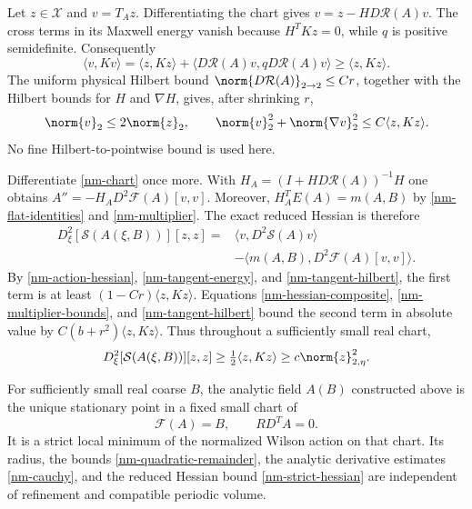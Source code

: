 Let $z\in\mathcal X$ and $v=T_Az$. Differentiating the chart gives
$v=z-HD\mathcal R(A)v$. The cross terms in its Maxwell energy
vanish because $H^TKz=0$, while $q$ is positive semidefinite.
Consequently
\begin{equation}\label{nm-tangent-energy}
 \langle v,Kv\rangle
 =\langle z,Kz\rangle+
   \langle D\mathcal R(A)v,qD\mathcal R(A)v\rangle
 \ge\langle z,Kz\rangle.
\end{equation}
The uniform physical Hilbert bound $\norm{D\mathcal R(A)}_{2\to2}
\le Cr$, together with the Hilbert bounds for $H$ and $\nabla H$,
gives, after shrinking $r$,
\begin{equation}\label{nm-tangent-hilbert}
 \norm{v}_2\le2\norm{z}_2,\qquad
 \norm{v}_2^2+\norm{\nabla v}_2^2
 \le C\langle z,Kz\rangle.
\end{equation}
No fine Hilbert-to-pointwise bound is used here.

Differentiate \eqref{nm-chart} once more. With
$H_A=(I+HD\mathcal R(A))^{-1}H$ one obtains
$A''=-H_AD^2\mathcal F(A)[v,v]$. Moreover,
$H_A^TE(A)=m(A,B)$ by \eqref{nm-flat-identities} and
\eqref{nm-multiplier}. The exact reduced Hessian is therefore
\begin{equation}\label{nm-reduced-hessian}
 \begin{split}
 D_\xi^2[\mathcal S(A(\xi,B))][z,z]
 ={}&\langle v,D^2\mathcal S(A)v\rangle\\
 &-\langle m(A,B),D^2\mathcal F(A)[v,v]\rangle.
 \end{split}
\end{equation}
By \eqref{nm-action-hessian}, \eqref{nm-tangent-energy}, and
\eqref{nm-tangent-hilbert}, the first term is at least
$(1-Cr)\langle z,Kz\rangle$. Equations
\eqref{nm-hessian-composite}, \eqref{nm-multiplier-bounds}, and
\eqref{nm-tangent-hilbert} bound the second term in absolute value
by $C(b+r^2)\langle z,Kz\rangle$. Thus throughout a sufficiently
small real chart,
\begin{equation}\label{nm-strict-hessian}
 D_\xi^2[\mathcal S(A(\xi,B))][z,z]
 \ge\tfrac12\langle z,Kz\rangle
 \ge c\norm{z}_{2,\eta}^2.
\end{equation}

\begin{theorem}
\label{nm-theorem}
For sufficiently small real coarse $B$, the analytic field $A(B)$
constructed above is the unique stationary point in a fixed small
chart of
\[
 \mathcal F(A)=B,\qquad RD^TA=0.
\]
It is a strict local minimum of the normalized Wilson action on
that chart. Its radius, the bounds \eqref{nm-quadratic-remainder},
the analytic derivative estimates \eqref{nm-cauchy}, and the reduced
Hessian bound \eqref{nm-strict-hessian} are independent of
refinement and compatible periodic volume.
\end{theorem}

